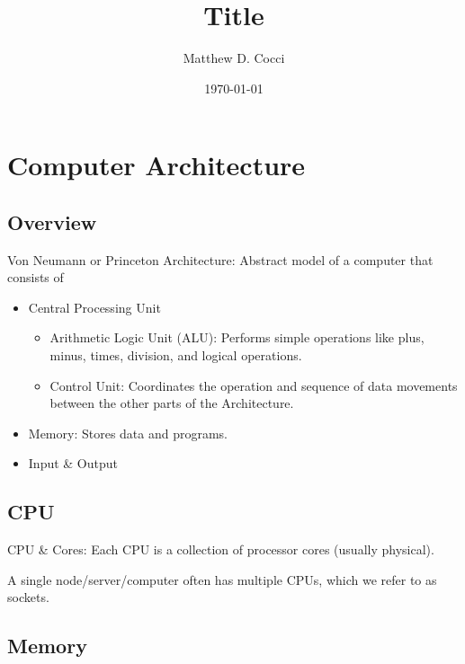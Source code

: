 \documentclass[12pt]{article}
\author{Matthew D. Cocci}
\title{Title}
\date{\today}
\theoremstyle{plain}
\theoremstyle{definition}
\theoremstyle{remark}
\begin{document}
\lstset{style=log}

\tableofcontents

\clearpage
\section{Computer Architecture}

\subsection{Overview}


Von Neumann or Princeton Architecture:
Abstract model of a computer that consists of
\begin{itemize}
  \item Central Processing Unit
    \begin{itemize}
      \item Arithmetic Logic Unit (ALU): Performs simple operations like
        plus, minus, times, division, and logical operations.
      \item Control Unit: Coordinates the operation and sequence of data
        movements between the other parts of the Architecture.
    \end{itemize}
  \item Memory:
    Stores data and programs.
  \item Input \& Output
\end{itemize}


\subsection{CPU}

CPU \& Cores:
Each CPU is a collection of processor cores (usually physical).

A single node/server/computer often has multiple CPUs, which we refer to
as sockets.


\clearpage
\subsection{Memory}
\end{document}
